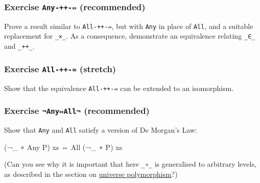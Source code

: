 \hypertarget{exercise-any---recommended}{%
\subsubsection{\texorpdfstring{Exercise \texttt{Any-++-⇔}
(recommended)}{Exercise Any-++-⇔ (recommended)}}\label{exercise-any---recommended}}

Prove a result similar to \texttt{All-++-⇔}, but with \texttt{Any} in
place of \texttt{All}, and a suitable replacement for \texttt{\_×\_}. As
a consequence, demonstrate an equivalence relating \texttt{\_∈\_} and
\texttt{\_++\_}.

\begin{fence}
\begin{code}%
\>[0]\<%
\end{code}
\end{fence}

\hypertarget{exercise-all---stretch}{%
\subsubsection{\texorpdfstring{Exercise \texttt{All-++-≃}
(stretch)}{Exercise All-++-≃ (stretch)}}\label{exercise-all---stretch}}

Show that the equivalence \texttt{All-++-⇔} can be extended to an
isomorphism.

\begin{fence}
\begin{code}%
\>[0]\<%
\end{code}
\end{fence}

\hypertarget{exercise-anyall-recommended}{%
\subsubsection{\texorpdfstring{Exercise \texttt{¬Any⇔All¬}
(recommended)}{Exercise ¬Any⇔All¬ (recommended)}}\label{exercise-anyall-recommended}}

Show that \texttt{Any} and \texttt{All} satisfy a version of De Morgan's
Law:

\begin{myDisplay}
(¬_ ∘ Any P) xs ⇔ All (¬_ ∘ P) xs
\end{myDisplay}

(Can you see why it is important that here \texttt{\_∘\_} is generalised
to arbitrary levels, as described in the section on
\protect\hyperlink{Equality-unipoly}{universe polymorphism}?)

